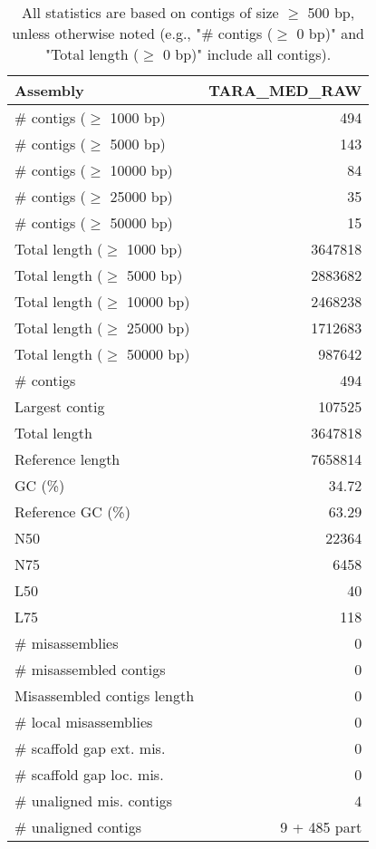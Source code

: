 \documentclass[12pt,a4paper]{article}
\begin{document}
\begin{table}[ht]
\begin{center}
\caption{All statistics are based on contigs of size $\geq$ 500 bp, unless otherwise noted (e.g., "\# contigs ($\geq$ 0 bp)" and "Total length ($\geq$ 0 bp)" include all contigs).}
\begin{tabular}{|l*{1}{|r}|}
\hline
Assembly & TARA\_MED\_RAW \\ \hline
\# contigs ($\geq$ 1000 bp) & 494 \\ \hline
\# contigs ($\geq$ 5000 bp) & 143 \\ \hline
\# contigs ($\geq$ 10000 bp) & 84 \\ \hline
\# contigs ($\geq$ 25000 bp) & 35 \\ \hline
\# contigs ($\geq$ 50000 bp) & 15 \\ \hline
Total length ($\geq$ 1000 bp) & 3647818 \\ \hline
Total length ($\geq$ 5000 bp) & 2883682 \\ \hline
Total length ($\geq$ 10000 bp) & 2468238 \\ \hline
Total length ($\geq$ 25000 bp) & 1712683 \\ \hline
Total length ($\geq$ 50000 bp) & 987642 \\ \hline
\# contigs & 494 \\ \hline
Largest contig & 107525 \\ \hline
Total length & 3647818 \\ \hline
Reference length & 7658814 \\ \hline
GC (\%) & 34.72 \\ \hline
Reference GC (\%) & 63.29 \\ \hline
N50 & 22364 \\ \hline
N75 & 6458 \\ \hline
L50 & 40 \\ \hline
L75 & 118 \\ \hline
\# misassemblies & 0 \\ \hline
\# misassembled contigs & 0 \\ \hline
Misassembled contigs length & 0 \\ \hline
\# local misassemblies & 0 \\ \hline
\# scaffold gap ext. mis. & 0 \\ \hline
\# scaffold gap loc. mis. & 0 \\ \hline
\# unaligned mis. contigs & 4 \\ \hline
\# unaligned contigs & 9 + 485 part \\ \hline

\end{tabular}
\end{center}
\end{table}
\end{document}
